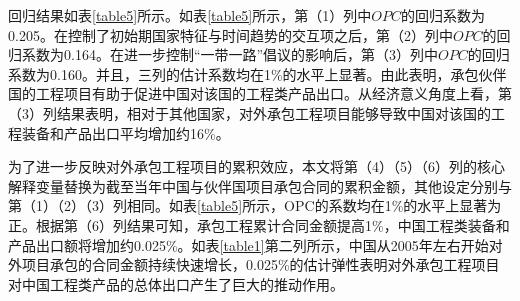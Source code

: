 \documentclass[a4paper,12pt]{article}
\begin{document}
\vspace{0.5em}  %

回归结果如表\ref{table5}所示。如表\ref{table5}所示，第（1）列中$OPC$的回归系数为0.205。在控制了初始期国家特征与时间趋势的交互项之后，第（2）列中$OPC$的回归系数为0.164。在进一步控制“一带一路”倡议的影响后，第（3）列中$OPC$的回归系数为0.160。并且，三列的估计系数均在1\%的水平上显著。由此表明，承包伙伴国的工程项目有助于促进中国对该国的工程类产品出口。从经济意义角度上看，第（3）列结果表明，相对于其他国家，对外承包工程项目能够导致中国对该国的工程装备和产品出口平均增加约16\%。

\vspace{0.5em}  %

为了进一步反映对外承包工程项目的累积效应，本文将第（4）（5）（6）列的核心解释变量替换为截至当年中国与伙伴国项目承包合同的累积金额，其他设定分别与第（1）（2）（3）列相同。如表\ref{table5}所示，OPC的系数均在1\%的水平上显著为正。根据第（6）列结果可知，承包工程累计合同金额提高1\%，中国工程类装备和产品出口额将增加约0.025\%。如表\ref{table1}第二列所示，中国从2005年左右开始对外项目承包的合同金额持续快速增长，0.025\%的估计弹性表明对外承包工程项目对中国工程类产品的总体出口产生了巨大的推动作用。
\end{document}

